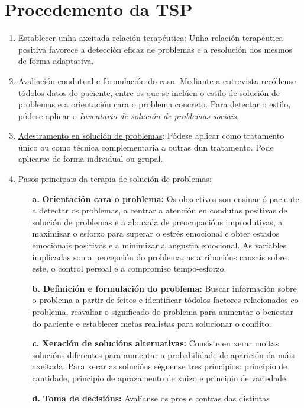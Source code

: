 \documentclass[a4paper,11pt]{article}
\begin{document}
\section{Procedemento da TSP}
\begin{enumerate}
	\item \underline{Establecer unha axeitada relación terapéutica}: Unha relación terapéutica 
	positiva favorece a detección eficaz de problemas e a resolución dos mesmos de forma adaptativa. 
	\item \underline{Avaliación condutual e formulación do caso}: Mediante a entrevista recóllense 
	tódolos datos do paciente, entre os que se inclúen o estilo de solución de problemas e a 
	orientación cara o problema concreto. Para detectar o estilo, pódese aplicar o \textit{Inventario 
	de solución de problemas sociais}. 
	\item \underline{Adestramento en solución de problemas}: Pódese aplicar como tratamento único ou 
	como técnica complementaria a outras dun tratamento. Pode aplicarse de forma individual ou 
	grupal. 
	\item \underline{Pasos principais da terapia de solución de problemas}:
	\begin{itemize}
		\item[\textbf{a.}] \textbf{Orientación cara o problema:} Os obxectivos son ensinar ó paciente 
		a detectar os problemas, a centrar a atención en condutas positivas de solución de problemas 
		e a alonxala de preocupacións improdutivas, a maximizar o esforzo para superar o estrés 
		emocional e obter estados emocionais positivos e a minimizar a angustia emocional. As 
		variables implicadas son a percepción do problema, as atribucións causais sobre este, o 
		control persoal e a compromiso tempo-esforzo. 
		\item[\textbf{b.}] \textbf{Definición e formulación do problema:} Buscar información sobre o 
		problema a partir de feitos e identificar tódolos factores relacionados co problema, 
		reavaliar o significado do problema para aumentar o benestar do paciente e establecer metas 
		realistas para solucionar o conflito. 
		\item[\textbf{c.}] \textbf{Xeración de solucións alternativas:} Consiste en xerar moitas 
		solucións diferentes para aumentar a probabilidade de aparición da máis axeitada. Para xerar 
		as solucións séguense tres principios: principio de cantidade, principio de aprazamento de 
		xuizo e principio de variedade.
		\item[\textbf{d.}] \textbf{Toma de decisións:} Avalíanse os pros e contras das distintas 

\end{itemize}
\end{enumerate}
\end{document}
